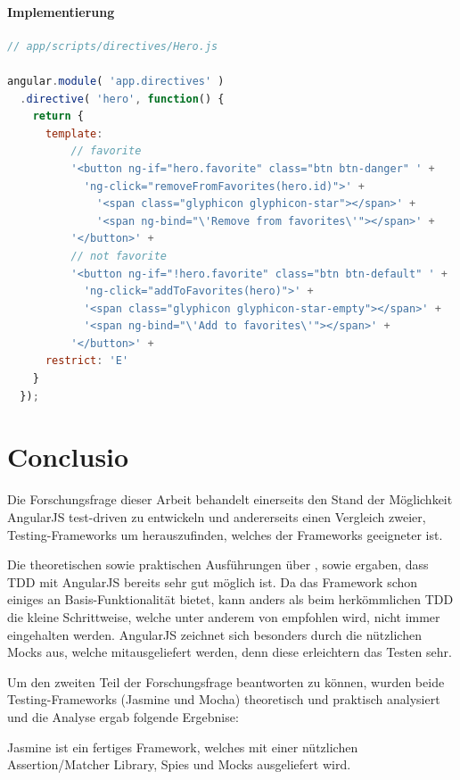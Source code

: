 \paragraph{Implementierung}
\begin{lstlisting}[language=JavaScript, caption=TDD AngularJS - Directives - Implementation]
// app/scripts/directives/Hero.js

angular.module( 'app.directives' )
  .directive( 'hero', function() {
    return {
      template: 
          // favorite
          '<button ng-if="hero.favorite" class="btn btn-danger" ' +
            'ng-click="removeFromFavorites(hero.id)">' +
              '<span class="glyphicon glyphicon-star"></span>' +
              '<span ng-bind="\'Remove from favorites\'"></span>' +
          '</button>' +
          // not favorite
          '<button ng-if="!hero.favorite" class="btn btn-default" ' +
            'ng-click="addToFavorites(hero)">' +
            '<span class="glyphicon glyphicon-star-empty"></span>' +
            '<span ng-bind="\'Add to favorites\'"></span>' +
          '</button>' +
      restrict: 'E'
    }
  });

\end{lstlisting}

\newpage
\section{Conclusio}
Die Forschungsfrage dieser Arbeit behandelt einerseits den Stand der Möglichkeit AngularJS test-driven zu entwickeln und andererseits einen Vergleich zweier, Testing-Frameworks um herauszufinden, welches der Frameworks geeigneter ist.

Die theoretischen sowie praktischen Ausführungen über ,  sowie  ergaben, dass TDD mit AngularJS bereits sehr gut möglich ist. Da das Framework schon einiges an Basis-Funktionalität bietet, kann anders als beim herkömmlichen TDD die kleine Schrittweise, welche unter anderem von \cite{Beck:2003} empfohlen wird, nicht immer eingehalten werden. AngularJS zeichnet sich besonders durch die nützlichen Mocks aus, welche mitausgeliefert werden, denn diese erleichtern das Testen sehr.

Um den zweiten Teil der Forschungsfrage beantworten zu können, wurden beide Testing-Frameworks (Jasmine und Mocha) theoretisch und praktisch analysiert und die Analyse ergab folgende Ergebnise:

Jasmine ist ein fertiges Framework, welches mit einer nützlichen Assertion/Matcher Library, Spies und Mocks ausgeliefert wird. 

